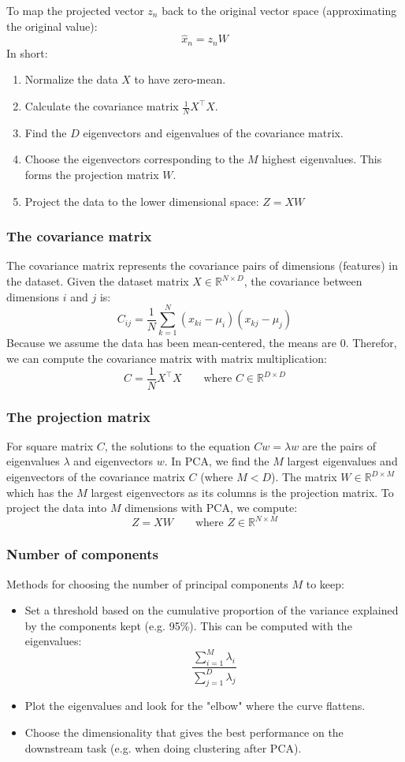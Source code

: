 \documentclass[11pt]{article}
\begin{document}
To map the projected vector $z_n$ back to the original vector space (approximating the original value):
$$
\hat{x}_n=z_nW
$$
In short:
\begin{enumerate}
    \item Normalize the data $X$ to have zero-mean.
    \item Calculate the covariance matrix $\frac{1}{N}X^{\top}X$.
    \item Find the $D$ eigenvectors and eigenvalues of the covariance matrix.
    \item Choose the eigenvectors corresponding to the $M$ highest eigenvalues. This forms the projection matrix $W$.
    \item Project the data to the lower dimensional space: $Z=XW$ 
\end{enumerate}
\subsubsection{The covariance matrix}
The covariance matrix represents the covariance pairs of dimensions (features) in the dataset. 
Given the dataset matrix $X\in\mathbb{R}^{N\times D}$, the covariance between dimensions $i$ and $j$ is:
$$
C_{ij}=\frac{1}{N}\sum_{k=1}^{N}(x_{ki}-\mu_i)(x_{kj}-\mu_j)
$$
Because we assume the data has been mean-centered, the means are 0. Therefor, we can compute the covariance matrix with matrix multiplication:
$$
C=\frac{1}{N}X^{\top}X\quad\quad\text{where }C\in\mathbb{R}^{D\times D}
$$
\subsubsection{The projection matrix}
For square matrix $C$, the solutions to the equation $Cw=\lambda w$ are the pairs of eigenvalues $\lambda$ and eigenvectors $w$.
In PCA, we find the $M$ largest eigenvalues and eigenvectors of the covariance matrix $C$ (where $M<D$). 
The matrix $W\in\mathbb{R}^{D\times M}$ which has the $M$ largest eigenvectors as its columns is the projection matrix.
To project the data into $M$ dimensions with PCA, we compute:
$$
Z=XW\quad\quad\text{where }Z\in\mathbb{R}^{N\times M}
$$
\subsubsection{Number of components}
Methods for choosing the number of principal components $M$ to keep:
\begin{itemize}
    \item Set a threshold based on the cumulative proportion of the variance explained by the components kept (e.g. 95\%). This can be computed with the eigenvalues:
$$
\frac{\sum_{i=1}^{M}\lambda_i}{\sum_{j=1}^{D}\lambda_j}
$$
    \item Plot the eigenvalues and look for the "elbow" where the curve flattens.
    \item Choose the dimensionality that gives the best performance on the downstream task (e.g. when doing clustering after PCA).
\end{itemize}
\end{document}

